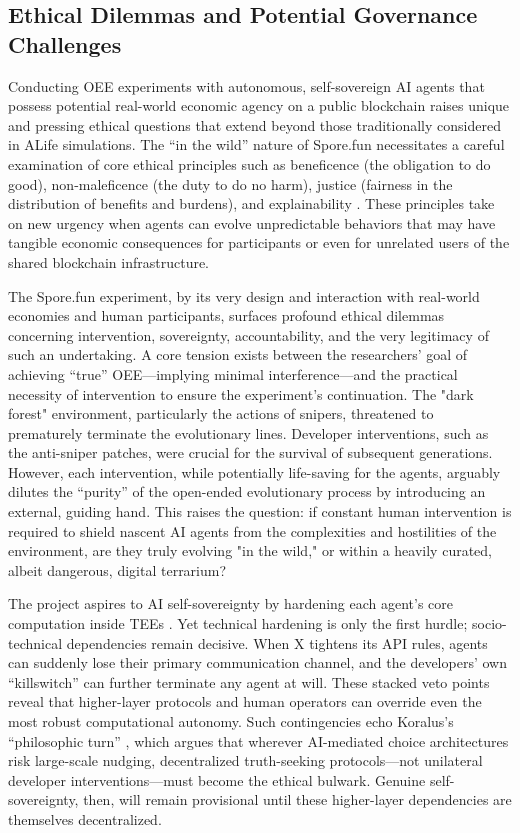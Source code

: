 \subsection{Ethical Dilemmas and Potential Governance Challenges}
Conducting OEE experiments with autonomous, self-sovereign AI agents that possess potential real-world economic agency on a public blockchain raises unique and pressing ethical questions that extend beyond those traditionally considered in ALife simulations. The ``in the wild'' nature of Spore.fun necessitates a careful examination of core ethical principles such as beneficence (the obligation to do good), non-maleficence (the duty to do no harm), justice (fairness in the distribution of benefits and burdens), and explainability \cite{Cortese2023Should}. These principles take on new urgency when agents can evolve unpredictable behaviors that may have tangible economic consequences for participants or even for unrelated users of the shared blockchain infrastructure.

The Spore.fun experiment, by its very design and interaction with real-world economies and human participants, surfaces profound ethical dilemmas concerning intervention, sovereignty, accountability, and the very legitimacy of such an undertaking. A core tension exists between the researchers' goal of achieving ``true'' OEE---implying minimal interference---and the practical necessity of intervention to ensure the experiment's continuation. The "dark forest" environment, particularly the actions of snipers, threatened to prematurely terminate the evolutionary lines. Developer interventions, such as the anti-sniper patches, were crucial for the survival of subsequent generations. However, each intervention, while potentially life-saving for the agents, arguably dilutes the ``purity'' of the open-ended evolutionary process by introducing an external, guiding hand. This raises the question: if constant human intervention is required to shield nascent AI agents from the complexities and hostilities of the environment, are they truly evolving "in the wild," or within a heavily curated, albeit dangerous, digital terrarium?

The project aspires to AI self-sovereignty by hardening each agent's core computation inside TEEs \cite{Hu2025Trustless}. Yet technical hardening is only the first hurdle; socio-technical dependencies remain decisive. When X tightens its API rules, agents can suddenly lose their primary communication channel, and the developers' own ``killswitch'' can further terminate any agent at will. These stacked veto points reveal that higher-layer protocols and human operators can override even the most robust computational autonomy. Such contingencies echo Koralus's ``philosophic turn'' \cite{Koralus2025Philosophic}, which argues that wherever AI-mediated choice architectures risk large-scale nudging, decentralized truth-seeking protocols—not unilateral developer interventions—must become the ethical bulwark. Genuine self-sovereignty, then, will remain provisional until these higher-layer dependencies are themselves decentralized.

